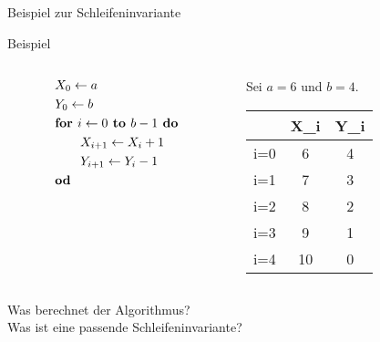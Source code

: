 \begin{frame}{Beispiel zur Schleifeninvariante}

	\begin{exampleblock}{Beispiel}
		\begin{columns}
			\begin{column}{0.4\textwidth}
				\begin{align*}
				&X_0 \leftarrow a\\
				&Y_0 \leftarrow b\\
				&\text{\textbf{for }} i \leftarrow 0 \text{\textbf{ to }} b-1 \text{\textbf{ do}}\\
				&\qquad X_{i+1} \leftarrow X_{i} + 1\\
				&\qquad Y_{i+1} \leftarrow Y_{i} - 1\\
				&\text{\textbf{od}}
				\end{align*}
			\end{column}

			\begin{column}{0.6\textwidth}
		\begin{center}
		Sei $a=6$ und $b=4$.\\[18pt]
		\begin{tabular}{C C C}
			 &X_i&Y_i\\
			\hline
			i=0&6&4 \\
			i=1&7&3 \\
			i=2&8&2\\
			i=3&9&1\\
			i=4&10&0\\ 
		\end{tabular}\end{center}
			\end{column}
			
		\end{columns}
		Was berechnet der Algorithmus?\\
		Was ist eine passende Schleifeninvariante?
	\end{exampleblock}
\end{frame}

